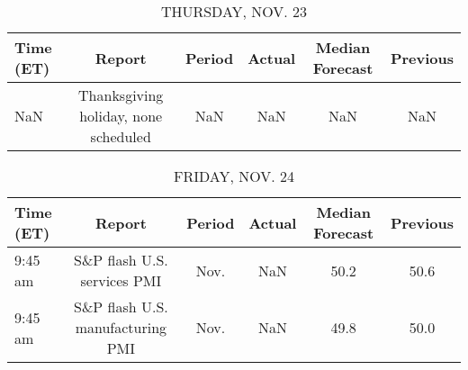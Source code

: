 \documentclass{article}%
\begin{document}
%


\begin{table}[htbp]%
\caption{THURSDAY, NOV. 23}%
\centering%
\begin{adjustbox}{width=1\textwidth}%
\begin{tabular}{lccccc}
\toprule
Time (ET) &                               Report & Period & Actual & Median Forecast & Previous \\
\midrule
      NaN & Thanksgiving holiday, none scheduled &    NaN &    NaN &             NaN &      NaN \\
\bottomrule
\end{tabular}
%
\end{adjustbox}%
\end{table}

%


\begin{table}[htbp]%
\caption{FRIDAY, NOV. 24}%
\centering%
\begin{adjustbox}{width=1\textwidth}%
\begin{tabular}{lccccc}
\toprule
Time (ET) &                           Report & Period & Actual & Median Forecast & Previous \\
\midrule
  9:45 am &      S\&P flash U.S. services PMI &   Nov. &    NaN &            50.2 &     50.6 \\
  9:45 am & S\&P flash U.S. manufacturing PMI &   Nov. &    NaN &            49.8 &     50.0 \\
\bottomrule
\end{tabular}
%
\end{adjustbox}%
\end{table}
\end{document}

